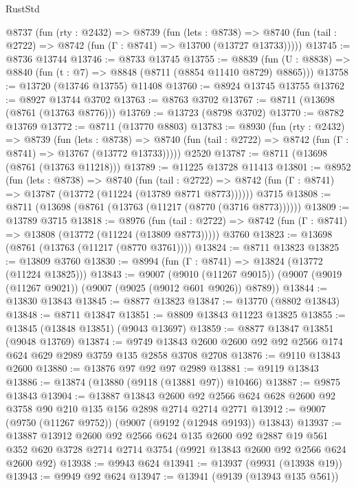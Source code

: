 \begin{lexlean}{RustStd}
\begin{coremodule}
  @8737
    (fun (rty : @2432) =>
    @8739
      (fun (lets : @8738) =>
      @8740 (fun (tail : @2722) => @8742 (fun (Γ : @8741) => @13700 (@13727 @13733)))))
@13745 := @8736 @13744
@13746 := @8733 @13745
@13755 := @8839
    (fun (U : @8838) => @8840 (fun (t : @7) => @8848 (@8711 (@8854 @11410 @8729) @8865)))
@13758 := @13720 (@13746 @13755) @11408
@13760 := @8924 @13745 @13755
@13762 := @8927 @13744 @3702
@13763 := @8763 @3702
@13767 := @8711 (@13698 (@8761 (@13763 @8776)))
@13769 := @13723 (@8798 @3702)
@13770 := @8782 @13769
@13772 := @8711 (@13770 @8803)
@13783 := @8930
    (fun (rty : @2432) =>
    @8739
      (fun (lets : @8738) =>
      @8740 (fun (tail : @2722) => @8742 (fun (Γ : @8741) => @13767 (@13772 @13733)))))
    @2520
@13787 := @8711 (@13698 (@8761 (@13763 @11218)))
@13789 := @11225 @13728 @11413
@13801 := @8952
    (fun (lets : @8738) =>
    @8740
      (fun (tail : @2722) =>
      @8742 (fun (Γ : @8741) => @13787 (@13772 (@11224 (@13789 @8771 @8773))))))
    @3715
@13808 := @8711 (@13698 (@8761 (@13763 (@11217 (@8770 (@3716 @8773))))))
@13809 := @13789 @3715
@13818 := @8976
    (fun (tail : @2722) => @8742 (fun (Γ : @8741) => @13808 (@13772 (@11224 (@13809 @8773)))))
    @3760
@13823 := @13698 (@8761 (@13763 (@11217 (@8770 @3761))))
@13824 := @8711 @13823
@13825 := @13809 @3760
@13830 := @8994 (fun (Γ : @8741) => @13824 (@13772 (@11224 @13825)))
@13843 := @9007
    (@9010 (@11267 @9015))
    (@9007 (@9019 (@11267 @9021)) (@9007 (@9025 (@9012 @601 @9026)) @8789))
@13844 := @13830 @13843
@13845 := @8877 @13823
@13847 := @13770 (@8802 @13843)
@13848 := @8711 @13847
@13851 := @8809 @13843 @11223 @13825
@13855 := @13845 (@13848 @13851) (@9043 @13697)
@13859 := @8877 @13847 @13851 (@9048 @13769)
@13874 := @9749 @13843 @2600 @2600 @92 @92 @2566 @174 @624 @629 @2989 @3759 @135 @2858 @3708 @2708
@13876 := @9110 @13843 @2600
@13880 := @13876 @97 @92 @97 @2989
@13881 := @9119 @13843
@13886 := @13874 (@13880 (@9118 (@13881 @97)) @10466)
@13887 := @9875 @13843
@13904 := @13887
    @13843
    @2600
    @92
    @2566
    @624
    @628
    @2600
    @92
    @3758
    @90
    @210
    @135
    @156
    @2898
    @2714
    @2714
    @2771
@13912 := @9007 (@9750 (@11267 @9752)) (@9007 (@9192 (@12948 @9193)) @13843)
@13937 := @13887
    @13912
    @2600
    @92
    @2566
    @624
    @135
    @2600
    @92
    @2887
    @19
    @561
    @352
    @620
    @3728
    @2714
    @2714
    @3754
    (@9921 @13843 @2600 @92 @2566 @624 @2600 @92)
@13938 := @9943 @624
@13941 := @13937 (@9931 (@13938 @19))
@13943 := @9949 @92 @624
@13947 := @13941 (@9139 (@13943 @135 @561))

\end{coremodule}
\end{lexlean}
